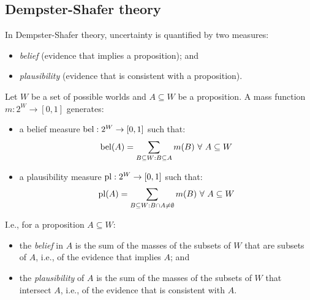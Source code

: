 \subsection{Dempster-Shafer theory}

In Dempster-Shafer theory, uncertainty is quantified by two measures:

\begin{itemize}
  \item \textit{belief} (evidence that implies a proposition); and
  \item \textit{plausibility} (evidence that is consistent with a proposition).
\end{itemize}

\begin{dfn}
  \label{def:4:BeliefPlausibility}
  Let $W$ be a set of possible worlds and $A \subseteq W$ be a proposition.
  A mass function $m : 2^W \to [0, 1]$ generates:
  \begin{itemize}
    \item a belief measure $\operatorname*{bel} : 2^W \to [0, 1]$ such that:
          \begin{equation}
            \label{eqn:4:Belief}
            \operatorname*{bel}(A) =
            \sum_{B \subseteq W : B \subseteq A} m(B)
            \ \forall\
            A \subseteq W
          \end{equation}
    \item a plausibility measure $\operatorname*{pl} : 2^W \to [0, 1]$ such that:
          \begin{equation}
            \label{eqn:4:Plausibility}
            \operatorname*{pl}(A) =
            \sum_{B \subseteq W : B \cap A \neq \emptyset} m(B)
            \ \forall\
            A \subseteq W
          \end{equation}
  \end{itemize}
\end{dfn}

I.e., for a proposition $A \subseteq W$:

\begin{itemize}
  \item the \textit{belief} in $A$ is the sum of the masses of the subsets of
        $W$ that are subsets of $A$, i.e., of the evidence that implies $A$; and
  \item the \textit{plausibility} of $A$ is the sum of the masses of the subsets
        of $W$ that intersect $A$, i.e., of the evidence that is consistent with
        $A$.
\end{itemize}

